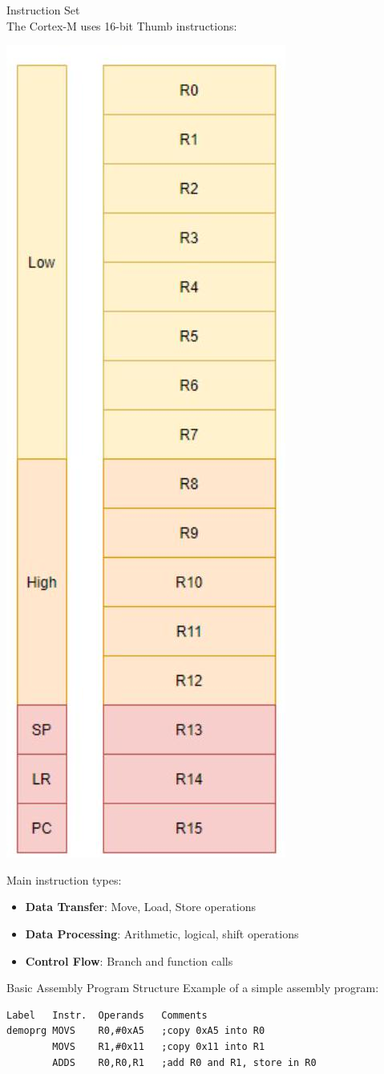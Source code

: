 \begin{definition}{Instruction Set}\\
The Cortex-M uses 16-bit Thumb instructions:

\includegraphics[width=0.35\linewidth, angle=90]{images/2024_12_29_79e6b22f503fb7b4f718g-02}

Main instruction types:
\begin{itemize}
  \item \textbf{Data Transfer}: Move, Load, Store operations
  \item \textbf{Data Processing}: Arithmetic, logical, shift operations
  \item \textbf{Control Flow}: Branch and function calls
\end{itemize}
\end{definition}

\begin{code}{Basic Assembly Program Structure}
Example of a simple assembly program:
\begin{lstlisting}[language=armasm, style=basesmol]
Label   Instr.  Operands   Comments
demoprg MOVS    R0,#0xA5   ;copy 0xA5 into R0
        MOVS    R1,#0x11   ;copy 0x11 into R1
        ADDS    R0,R0,R1   ;add R0 and R1, store in R0
\end{lstlisting}
\end{code}

